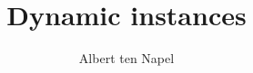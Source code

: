 \documentclass[12pt]{article}
\title{Dynamic instances}
\author{Albert ten Napel}
\date{}
\begin{document}
\maketitle

\inputminted{haskell}{code.hs}
\end{document}
